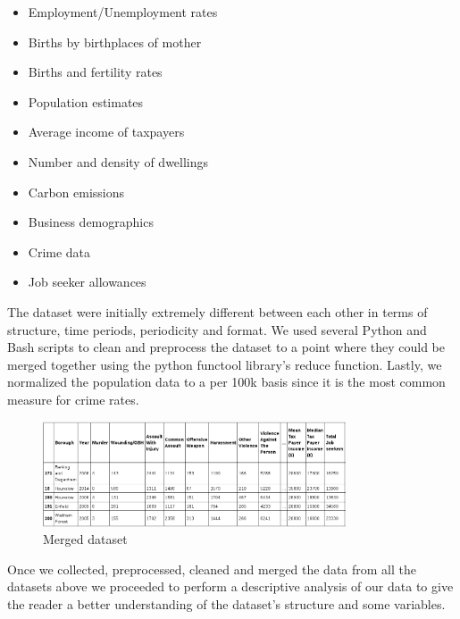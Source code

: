 \documentclass[12pt, openany]{report}
\begin{document}
\begin{itemize}

\item Employment/Unemployment rates
\item Births by birthplaces of mother
\item Births and fertility rates
\item Population estimates
\item Average income of taxpayers
\item Number and density of dwellings
\item Carbon emissions
\item Business demographics
\item Crime data
\item Job seeker allowances

\end{itemize}

The dataset were initially extremely different between each other in terms of structure, time periods, periodicity and format. We used several Python and Bash scripts to clean and preprocess the dataset to a point where they could be merged together using the python functool library's reduce function. Lastly, we normalized the population data to a per 100k basis since it is the most common measure for crime rates.

\begin{figure}[h!]
\centering
        \includegraphics[width=0.8\textwidth]{images/merged_dataset.png}
        \caption{Merged dataset}
\end{figure}

Once we collected, preprocessed, cleaned and merged the data from all the datasets above we proceeded to perform a descriptive analysis of our data to give the reader a better understanding of the dataset’s structure and some variables.
\end{document}
